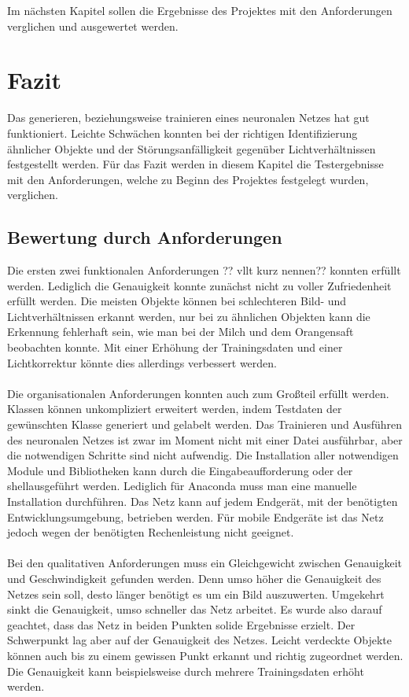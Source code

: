 \documentclass[a4paper,12pt,oneside]{article}
\begin{document}
Im nächsten Kapitel sollen die Ergebnisse des Projektes mit den Anforderungen verglichen und ausgewertet werden.

\newpage

\section{Fazit}
Das generieren, beziehungsweise trainieren eines neuronalen Netzes hat gut funktioniert. Leichte Schwächen konnten bei der richtigen Identifizierung ähnlicher Objekte und der Störungsanfälligkeit gegenüber Lichtverhältnissen festgestellt werden. Für das Fazit werden in diesem Kapitel die Testergebnisse mit den Anforderungen, welche zu Beginn des Projektes festgelegt wurden, verglichen.\\

\subsection{Bewertung durch Anforderungen}

Die ersten zwei funktionalen Anforderungen ?? vllt kurz nennen?? konnten erfüllt werden. Lediglich die Genauigkeit konnte zunächst nicht zu voller Zufriedenheit erfüllt werden. Die meisten Objekte können bei schlechteren Bild- und Lichtverhältnissen erkannt werden, nur bei zu ähnlichen Objekten kann die Erkennung fehlerhaft sein, wie man bei der Milch und dem Orangensaft beobachten konnte. Mit einer Erhöhung der Trainingsdaten und einer Lichtkorrektur könnte dies allerdings verbessert werden.\\
\\
Die organisationalen Anforderungen konnten auch zum Großteil erfüllt werden. Klassen können unkompliziert erweitert werden, indem Testdaten der gewünschten Klasse generiert und gelabelt werden. Das Trainieren und Ausführen des neuronalen Netzes ist zwar im Moment nicht mit einer Datei ausführbar, aber die notwendigen Schritte sind nicht aufwendig. Die Installation aller notwendigen Module und Bibliotheken kann durch die Eingabeaufforderung oder der \glqq shell\grqq ausgeführt werden. Lediglich für Anaconda muss man eine manuelle Installation durchführen. Das Netz kann auf jedem Endgerät, mit der benötigten Entwicklungsumgebung, betrieben werden. Für mobile Endgeräte ist das Netz jedoch wegen der benötigten Rechenleistung nicht geeignet.\\
\\
Bei den qualitativen Anforderungen muss ein Gleichgewicht zwischen Genauigkeit und Geschwindigkeit gefunden werden. Denn umso höher die Genauigkeit des Netzes sein soll, desto länger benötigt es um ein Bild auszuwerten. Umgekehrt sinkt die Genauigkeit, umso schneller das Netz arbeitet. Es wurde also darauf geachtet, dass das Netz in beiden Punkten solide Ergebnisse erzielt. Der Schwerpunkt lag aber auf der Genauigkeit des Netzes. Leicht verdeckte Objekte können auch bis zu einem gewissen Punkt erkannt und richtig zugeordnet werden. Die Genauigkeit kann beispielsweise durch mehrere Trainingsdaten erhöht werden.\\
\end{document}
